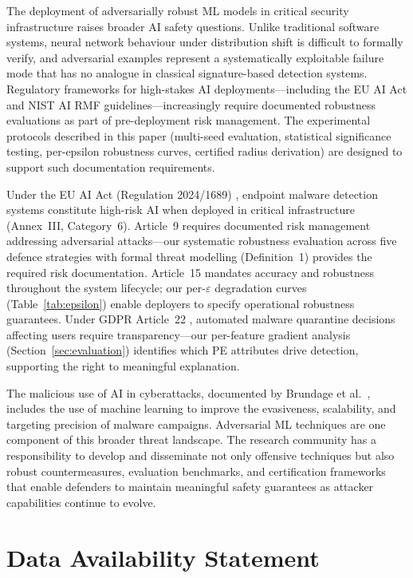 \documentclass[conference]{IEEEtran}
\begin{document}
The deployment of adversarially robust ML models in critical security infrastructure raises broader AI safety questions. Unlike traditional software systems, neural network behaviour under distribution shift is difficult to formally verify, and adversarial examples represent a systematically exploitable failure mode that has no analogue in classical signature-based detection systems. Regulatory frameworks for high-stakes AI deployments---including the EU AI Act and NIST AI RMF guidelines---increasingly require documented robustness evaluations as part of pre-deployment risk management. The experimental protocols described in this paper (multi-seed evaluation, statistical significance testing, per-epsilon robustness curves, certified radius derivation) are designed to support such documentation requirements.

Under the EU AI Act (Regulation 2024/1689) \cite{euaiact2024}, endpoint malware detection systems constitute high-risk AI when deployed in critical infrastructure (Annex~III, Category~6). Article~9 requires documented risk management addressing adversarial attacks---our systematic robustness evaluation across five defence strategies with formal threat modelling (Definition~1) provides the required risk documentation. Article~15 mandates accuracy and robustness throughout the system lifecycle; our per-$\varepsilon$ degradation curves (Table~\ref{tab:epsilon}) enable deployers to specify operational robustness guarantees. Under GDPR Article~22 \cite{gdpr2016}, automated malware quarantine decisions affecting users require transparency---our per-feature gradient analysis (Section~\ref{sec:evaluation}) identifies which PE attributes drive detection, supporting the right to meaningful explanation.

The malicious use of AI in cyberattacks, documented by Brundage et al.\ \cite{brundage2018}, includes the use of machine learning to improve the evasiveness, scalability, and targeting precision of malware campaigns. Adversarial ML techniques are one component of this broader threat landscape. The research community has a responsibility to develop and disseminate not only offensive techniques but also robust countermeasures, evaluation benchmarks, and certification frameworks that enable defenders to maintain meaningful safety guarantees as attacker capabilities continue to evolve.

\section{Data Availability Statement}
\label{sec:data}
\end{document}
